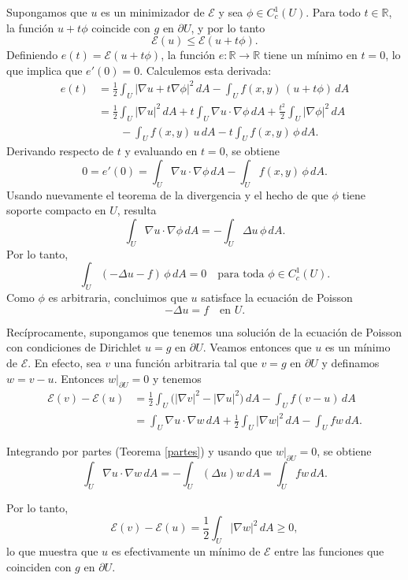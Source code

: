 \documentclass[12pt, a4paper]{amsbook}
\newcommand{\R}{{\mathbb R}}
\newcommand{\Ec}{{\mathcal E}}
\theoremstyle{remark}
\theoremstyle{definition}
\numberwithin{section}{chapter}
\numberwithin{subsection}{section}
\numberwithin{equation}{section}
\numberwithin{figure}{chapter}
\begin{document}
Supongamos que $u$ es un minimizador de $\Ec$ y sea $\phi\in C_c^1(U)$. Para todo $t\in\R$, la función $u+t\phi$ coincide con $g$ en $\partial U$, y por lo tanto
\[
\Ec(u)\le \Ec(u+t\phi).
\]
Definiendo $e(t)=\Ec(u+t\phi)$, la función $e\colon\R\to\R$ tiene un mínimo en $t=0$, lo que implica que $e'(0)=0$. Calculemos esta derivada:
\begin{align*}
e(t)
&= \frac12\int_U |\nabla u+t\nabla\phi|^2\,dA
- \int_U f(x,y)\,(u+t\phi)\,dA \\
&= \frac12\int_U |\nabla u|^2\,dA
+ t\int_U \nabla u\cdot\nabla\phi\,dA
+ \frac{t^2}{2}\int_U |\nabla\phi|^2\,dA \\
&\qquad
- \int_U f(x,y)\,u\,dA
- t\int_U f(x,y)\,\phi\,dA.
\end{align*}
Derivando respecto de $t$ y evaluando en $t=0$, se obtiene
\[
0=e'(0)
= \int_U \nabla u\cdot\nabla\phi\,dA
- \int_U f(x,y)\,\phi\,dA.
\]
Usando nuevamente el teorema de la divergencia y el hecho de que $\phi$ tiene soporte compacto en $U$, resulta
\[
\int_U \nabla u\cdot\nabla\phi\,dA
= -\int_U \Delta u\,\phi\,dA.
\]
Por lo tanto,
\[
\int_U (-\Delta u - f)\,\phi\,dA = 0
\quad\text{para toda }\phi\in C_c^1(U).
\]
Como $\phi$ es arbitraria, concluimos que $u$ satisface la ecuación de Poisson
\begin{equation}\label{eq:poisson}
-\Delta u = f \quad \text{en } U.
\end{equation}

Recíprocamente, supongamos que tenemos una solución de la ecuación de Poisson con condiciones de Dirichlet $u=g$ en $\partial U$. Veamos entonces que $u$ es un mínimo de $\Ec$. En efecto, sea $v$ una función arbitraria tal que $v=g$ en $\partial U$ y definamos $w = v-u$. Entonces $w|_{\partial U}=0$ y tenemos
\[
\begin{aligned}
\Ec(v) - \Ec(u) 
&= \frac12 \int_U \bigl(|\nabla v|^2 - |\nabla u|^2\bigr) \, dA - \int_U f (v-u) \, dA \\
&= \int_U \nabla u \cdot \nabla w \, dA + \frac12 \int_U |\nabla w|^2 \, dA - \int_U f w \, dA.
\end{aligned}
\]

Integrando por partes (Teorema \ref{partes}) y usando que $w|_{\partial U}=0$, se obtiene
\[
\int_U \nabla u \cdot \nabla w \, dA = - \int_U (\Delta u) w \, dA = \int_U f w \, dA.
\]

Por lo tanto,
\[
\Ec(v) - \Ec(u) = \frac12 \int_U |\nabla w|^2 \, dA \ge 0,
\]
lo que muestra que $u$ es efectivamente un mínimo de $\Ec$ entre las funciones que coinciden con $g$ en $\partial U$.
\end{document}
